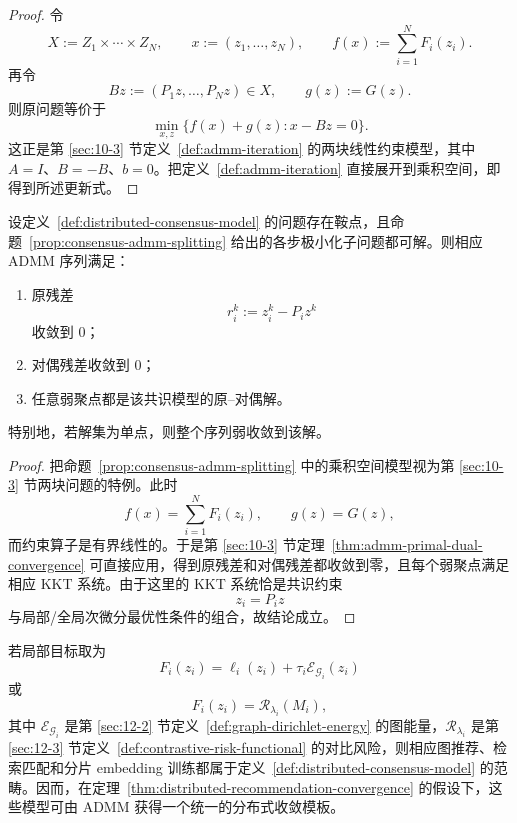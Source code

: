 \begin{proof}
令
\[
X:=Z_1\times \cdots\times Z_N,
\qquad
x:=(z_1,\dots,z_N),
\qquad
f(x):=\sum_{i=1}^N F_i(z_i).
\]
再令
\[
Bz:=(P_1 z,\dots,P_N z)\in X,
\qquad
g(z):=G(z).
\]
则原问题等价于
\[
\min_{x,z}\{f(x)+g(z):x-Bz=0\}.
\]
这正是第 \ref{sec:10-3} 节定义~\ref{def:admm-iteration} 的两块线性约束模型，其中 $A=I$、$B=-B$、$b=0$。把定义~\ref{def:admm-iteration} 直接展开到乘积空间，即得到所述更新式。
\end{proof}

\begin{theorem}[分布式推荐模型的收敛模板]\label{thm:distributed-recommendation-convergence}
设定义~\ref{def:distributed-consensus-model} 的问题存在鞍点，且命题~\ref{prop:consensus-admm-splitting} 给出的各步极小化子问题都可解。则相应 ADMM 序列满足：
\begin{enumerate}
  \item 原残差
  \[
  r_i^k:=z_i^k-P_i z^k
  \]
  收敛到 $0$；
  \item 对偶残差收敛到 $0$；
  \item 任意弱聚点都是该共识模型的原--对偶解。
\end{enumerate}
特别地，若解集为单点，则整个序列弱收敛到该解。
\end{theorem}

\begin{proof}
把命题~\ref{prop:consensus-admm-splitting} 中的乘积空间模型视为第 \ref{sec:10-3} 节两块问题的特例。此时
\[
f(x)=\sum_{i=1}^N F_i(z_i),\qquad g(z)=G(z),
\]
而约束算子是有界线性的。于是第 \ref{sec:10-3} 节定理~\ref{thm:admm-primal-dual-convergence} 可直接应用，得到原残差和对偶残差都收敛到零，且每个弱聚点满足相应 KKT 系统。由于这里的 KKT 系统恰是共识约束
\[
z_i=P_i z
\]
与局部/全局次微分最优性条件的组合，故结论成立。
\end{proof}

\begin{corollary}[图推荐与表示匹配的分布式模板]\label{cor:graph-recommendation-distributed-template}
若局部目标取为
\[
F_i(z_i)=\ell_i(z_i)+\tau_i\mathcal E_{\mathscr G_i}(z_i)
\]
或
\[
F_i(z_i)=\mathcal R_{\lambda_i}(M_i),
\]
其中 $\mathcal E_{\mathscr G_i}$ 是第 \ref{sec:12-2} 节定义~\ref{def:graph-dirichlet-energy} 的图能量，$\mathcal R_{\lambda_i}$ 是第 \ref{sec:12-3} 节定义~\ref{def:contrastive-risk-functional} 的对比风险，则相应图推荐、检索匹配和分片 embedding 训练都属于定义~\ref{def:distributed-consensus-model} 的范畴。因而，在定理~\ref{thm:distributed-recommendation-convergence} 的假设下，这些模型可由 ADMM 获得一个统一的分布式收敛模板。
\end{corollary}

